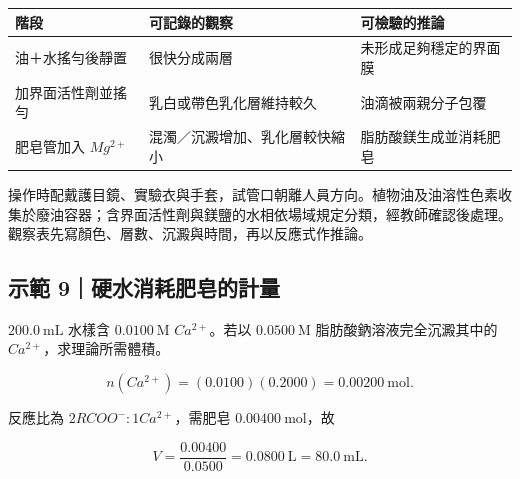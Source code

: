 \documentclass[11pt,a4paper]{article}
\newcounter{none}
\begin{document}
{\def\LTcaptype{none} %
\begin{longtable}[]{@{}
  >{\raggedright\arraybackslash}p{}
  >{\raggedright\arraybackslash}p{}
  >{\raggedright\arraybackslash}p{}@{}}
\toprule\noalign{}
\begin{minipage}[b]{\linewidth}\raggedright
階段
\end{minipage} & \begin{minipage}[b]{\linewidth}\raggedright
可記錄的觀察
\end{minipage} & \begin{minipage}[b]{\linewidth}\raggedright
可檢驗的推論
\end{minipage} \\
\midrule\noalign{}
\endhead
\bottomrule\noalign{}
\endlastfoot
油＋水搖勻後靜置 & 很快分成兩層 & 未形成足夠穩定的界面膜 \\
加界面活性劑並搖勻 & 乳白或帶色乳化層維持較久 & 油滴被兩親分子包覆 \\
肥皂管加入 \(Mg^{2+}\) & 混濁／沉澱增加、乳化層較快縮小 & 脂肪酸鎂生成並消耗肥皂 \\
\end{longtable}
}

操作時配戴護目鏡、實驗衣與手套，試管口朝離人員方向。植物油及油溶性色素收集於廢油容器；含界面活性劑與鎂鹽的水相依場域規定分類，經教師確認後處理。觀察表先寫顏色、層數、沉澱與時間，再以反應式作推論。

\begin{HandoutWorkedExample}

\subsection{示範 9｜硬水消耗肥皂的計量}\label{ux793aux7bc4-9ux786cux6c34ux6d88ux8017ux80a5ux7682ux7684ux8a08ux91cf}

\(200.0\ \mathrm{mL}\) 水樣含 \(0.0100\ \mathrm M\) \(Ca^{2+}\)。若以 \(0.0500\ \mathrm M\) 脂肪酸鈉溶液完全沉澱其中的 \(Ca^{2+}\)，求理論所需體積。

\[
n(Ca^{2+})=(0.0100)(0.2000)=0.00200\ \mathrm{mol}.
\]

反應比為 \(2RCOO^-:1Ca^{2+}\)，需肥皂 \(0.00400\ \mathrm{mol}\)，故

\[
V=\frac{0.00400}{0.0500}=0.0800\ \mathrm L=80.0\ \mathrm{mL}.
\]

\end{HandoutWorkedExample}
\end{document}
